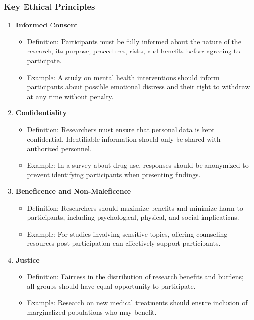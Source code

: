 \documentclass[aspectratio=169]{beamer}
\begin{document}
\begin{frame}[fragile]
    \frametitle{Key Ethical Principles}
    \begin{enumerate}
        \item \textbf{Informed Consent}
        \begin{itemize}
            \item Definition: Participants must be fully informed about the nature of the research, its purpose, procedures, risks, and benefits before agreeing to participate.
            \item Example: A study on mental health interventions should inform participants about possible emotional distress and their right to withdraw at any time without penalty.
        \end{itemize}
        
        \item \textbf{Confidentiality}
        \begin{itemize}
            \item Definition: Researchers must ensure that personal data is kept confidential. Identifiable information should only be shared with authorized personnel.
            \item Example: In a survey about drug use, responses should be anonymized to prevent identifying participants when presenting findings.
        \end{itemize}
        
        \item \textbf{Beneficence and Non-Maleficence}
        \begin{itemize}
            \item Definition: Researchers should maximize benefits and minimize harm to participants, including psychological, physical, and social implications.
            \item Example: For studies involving sensitive topics, offering counseling resources post-participation can effectively support participants.
        \end{itemize}
        
        \item \textbf{Justice}
        \begin{itemize}
            \item Definition: Fairness in the distribution of research benefits and burdens; all groups should have equal opportunity to participate.
            \item Example: Research on new medical treatments should ensure inclusion of marginalized populations who may benefit.
        \end{itemize}
    \end{enumerate}
\end{frame}
\end{document}
